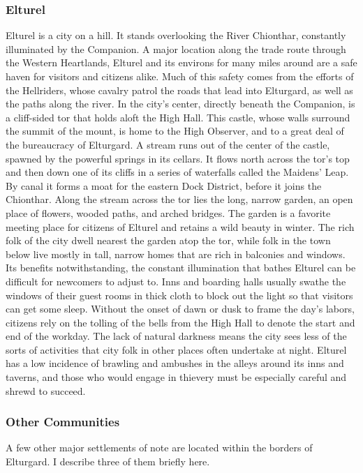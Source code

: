 \documentclass[10pt,a4paper,twoside,twocolumn,openany,bg=print,nodeprecatedcode]{dndbook}
\begin{document}
\subsubsection{Elturel}
Elturel is a city on a hill. It stands overlooking the River Chionthar, constantly illuminated by the Companion. A major location along the trade route through the Western Heartlands, Elturel and its environs for many miles around are a safe haven for visitors and citizens alike. Much of this safety comes from the efforts of the Hellriders, whose cavalry patrol the roads that lead into Elturgard, as well as the paths along the river.
In the city's center, directly beneath the Companion, is a cliff-sided tor that holds aloft the High Hall. This castle, whose walls surround the summit of the mount, is home to the High Observer, and to a great deal of the bureaucracy of Elturgard. A stream runs out of the center of the castle, spawned by the powerful springs in its cellars. It flows north across the tor's top and then down one of its cliffs in a series of waterfalls called the Maidens' Leap. By canal it forms a moat for the eastern Dock District, before it joins the Chionthar. Along the stream across the tor lies the long, narrow garden, an open place of flowers, wooded paths, and arched bridges. The garden is a favorite meeting place for citizens of Elturel and retains a wild beauty in winter. The rich folk of the city dwell nearest the garden atop the tor, while folk in the town below live mostly in tall, narrow homes that are rich in balconies and windows.
Its benefits notwithstanding, the constant illumination that bathes Elturel can be difficult for newcomers to adjust to. Inns and boarding halls usually swathe the windows of their guest rooms in thick cloth to block out the light so that visitors can get some sleep. Without the onset of dawn or dusk to frame the day's labors, citizens rely on the tolling of the bells from the High Hall to denote the start and end of the workday. The lack of natural darkness means the city sees less of the sorts of activities that city folk in other places often undertake at night. Elturel has a low incidence of brawling and ambushes in the alleys around its inns and taverns, and those who would engage in thievery must be especially careful and shrewd to succeed.
\subsubsection{Other Communities}
A few other major settlements of note are located within the borders of Elturgard. I describe three of them briefly here.
\end{document}
